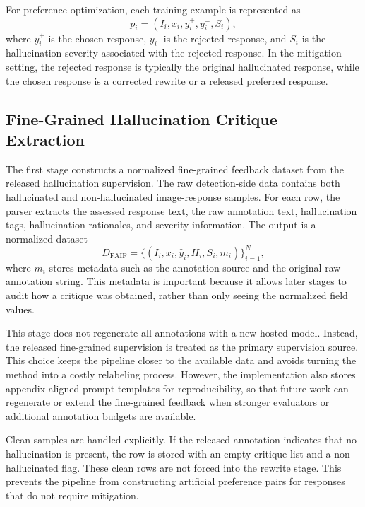 \documentclass{article}
\begin{document}
For preference optimization, each training example is represented as
\begin{equation}
p_i = (I_i, x_i, y_i^+, y_i^-, S_i),
\end{equation}
where $y_i^+$ is the chosen response, $y_i^-$ is the rejected response, and $S_i$ is the hallucination severity associated with the rejected response. In the mitigation setting, the rejected response is typically the original hallucinated response, while the chosen response is a corrected rewrite or a released preferred response.

\subsection{Fine-Grained Hallucination Critique Extraction}

The first stage constructs a normalized fine-grained feedback dataset from the released hallucination supervision. The raw detection-side data contains both hallucinated and non-hallucinated image-response samples. For each row, the parser extracts the assessed response text, the raw annotation text, hallucination tags, hallucination rationales, and severity information. The output is a normalized dataset
\begin{equation}
D_{\mathrm{FAIF}} = \{(I_i, x_i, \hat{y}_i, H_i, S_i, m_i)\}_{i=1}^{N},
\end{equation}
where $m_i$ stores metadata such as the annotation source and the original raw annotation string. This metadata is important because it allows later stages to audit how a critique was obtained, rather than only seeing the normalized field values.

This stage does not regenerate all annotations with a new hosted model. Instead, the released fine-grained supervision is treated as the primary supervision source. This choice keeps the pipeline closer to the available data and avoids turning the method into a costly relabeling process. However, the implementation also stores appendix-aligned prompt templates for reproducibility, so that future work can regenerate or extend the fine-grained feedback when stronger evaluators or additional annotation budgets are available.

Clean samples are handled explicitly. If the released annotation indicates that no hallucination is present, the row is stored with an empty critique list and a non-hallucinated flag. These clean rows are not forced into the rewrite stage. This prevents the pipeline from constructing artificial preference pairs for responses that do not require mitigation.
\end{document}
